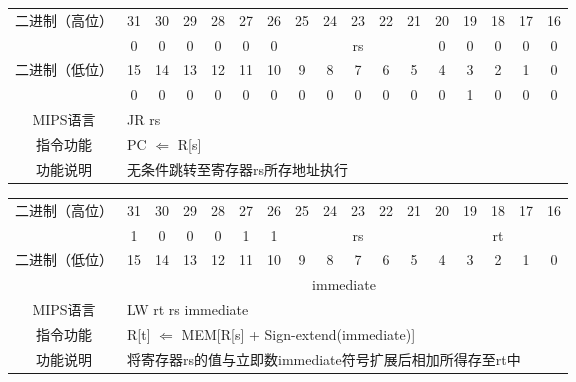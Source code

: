 \begin{table}
\begin{tabular}{|c|c|c|c|c|c|c|c|c|c|c|c|c|c|c|c|c|}
\hline
\multirow{2}{*}{二进制（高位）} &
31&30&29&28&27&26&25&24&23&22&21&20&19&18&17&16\\
\cline{2-17}
&
0&0&0&0&0&
0&
\multicolumn{5}{c|}{rs}&
0&0&0&0&0\\
\hline
\multirow{2}{*}{二进制（低位）} &
15&14&13&12&11&10&9&8&7&6&5&4&3&2&1&0\\
\cline{2-17}
&
0&0&0&0&0&
0&0&0&0&0&
0&0&1&0&0&
0\\
\hline
MIPS语言&
\multicolumn{16}{l|}{JR rs}\\
\hline
指令功能&
\multicolumn{16}{l|}{PC $\Leftarrow$ R[s]}\\
\hline
功能说明&
\multicolumn{16}{l|}{无条件跳转至寄存器rs所存地址执行}\\
\hline
\end{tabular}
\end{table}

\begin{table}
\begin{tabular}{|c|c|c|c|c|c|c|c|c|c|c|c|c|c|c|c|c|}
\hline
\multirow{2}{*}{二进制（高位）} &
31&30&29&28&27&26&25&24&23&22&21&20&19&18&17&16\\
\cline{2-17}
&
1&0&0&0&1&
1&
\multicolumn{5}{c|}{rs}&
\multicolumn{5}{c|}{rt}\\
\hline
\multirow{2}{*}{二进制（低位）} &
15&14&13&12&11&10&9&8&7&6&5&4&3&2&1&0\\
\cline{2-17}
&
\multicolumn{16}{c|}{immediate}\\
\hline
MIPS语言&
\multicolumn{16}{l|}{LW rt rs immediate}\\
\hline
指令功能&
\multicolumn{16}{l|}{R[t] $\Leftarrow$ MEM[R[s] + Sign-extend(immediate)]}\\
\hline
功能说明&
\multicolumn{16}{l|}{将寄存器rs的值与立即数immediate符号扩展后相加所得存至rt中}\\
\hline
\end{tabular}
\end{table}

